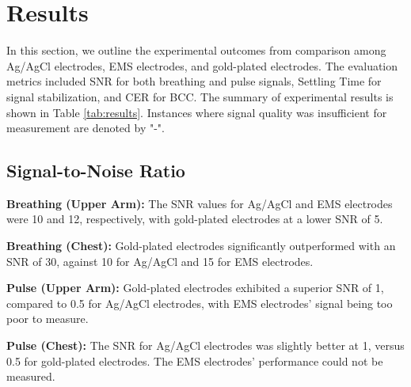\documentclass[conference]{IEEEtran}
\begin{document}



%

\section{Results}

In this section, we outline the experimental outcomes from comparison among Ag/AgCl electrodes, \gls{EMS} electrodes, and gold-plated electrodes. The evaluation metrics included \gls{SNR} for both breathing and pulse signals, Settling Time for signal stabilization, and \gls{CER}  for \gls{BCC}. The summary of experimental results is shown in Table \ref{tab:results}. Instances where signal quality was insufficient for measurement are denoted by "-".

\subsection{Signal-to-Noise Ratio}

 \textbf{Breathing (Upper Arm):} The \gls{SNR} values for Ag/AgCl and \gls{EMS} electrodes were 10 and 12, respectively, with gold-plated electrodes at a lower \gls{SNR} of 5.
 
\textbf{Breathing (Chest):} Gold-plated electrodes significantly outperformed with an \gls{SNR} of 30, against 10 for Ag/AgCl and 15 for \gls{EMS} electrodes.

 \textbf{Pulse (Upper Arm):} Gold-plated electrodes exhibited a superior \gls{SNR} of 1, compared to 0.5 for Ag/AgCl electrodes, with \gls{EMS} electrodes' signal being too poor to measure.

 \textbf{Pulse (Chest):} The \gls{SNR} for Ag/AgCl electrodes was slightly better at 1, versus 0.5 for gold-plated electrodes. The \gls{EMS} electrodes' performance could not be measured.
\end{document}
